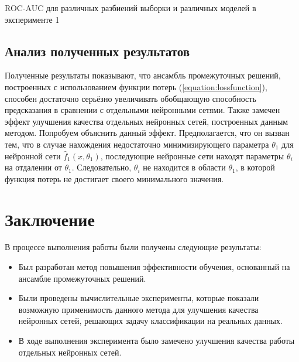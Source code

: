 \documentclass[12pt, fleqn]{article}
\newcommand{\predictionfunction}{\hat{f}}
\newcommand{\reference}[1]{(\hyperref[#1]{\ref{#1}})}
\begin{document}
\begin{center}
	
	\begin{table}[h!]
		\caption{ROC-AUC для различных разбиений выборки и различных моделей в эксперименте 1}
		\label{tabular:results}
	\end{table}
\end{center}

\subsection{Анализ полученных результатов}

Полученные результаты показывают, что ансамбль промежуточных решений, построенных с использованием функции потерь \reference{equation:lossfunction}, способен достаточно серьёзно увеличивать обобщающую способность предсказания в сравнении с отдельными нейронными сетями.
Также замечен эффект улучшения качества отдельных нейронных сетей, построенных данным методом. Попробуем объяснить данный эффект. Предполагается, что он вызван тем, что в случае нахождения недостаточно минимизирующего параметра $\theta_1$ для нейронной сети $\predictionfunction_1(x, \theta_1)$, последующие нейронные сети находят параметры $\theta_i$ на отдалении от $\theta_1$. Следовательно, $\theta_i$ не находится в области $\theta_1$, в которой функция потерь не достигает своего минимального значения.

\section{Заключение}

В процессе выполнения работы были получены следующие результаты:
\begin{itemize}
\item Был разработан метод повышения эффективности обучения, основанный на ансамбле промежуточных решений.
\item Были проведены вычислительные эксперименты, которые показали возможную применимость данного метода для улучшения качества нейронных сетей, решающих задачу классификации на реальных данных.
\item В ходе выполнения эксперимента было замечено улучшения качества работы отдельных нейронных сетей.
\end{itemize}

\def\BibUrl#1.{}\def\BibAnnote#1.{}


\end{document}
